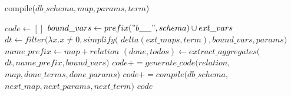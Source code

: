 


\newcommand{\indentcode}{\hspace{5mm}}
\begin{algorithm}
\caption{compile($db\_schema, map, params, term$)}
\label{alg:compile}
\begin{algorithmic}[1]
\STATE $code \leftarrow []$
  \STATE {}
  \STATE $bound\_vars \leftarrow prefix("b\_\_", schema) \cup ext\_vars$
  \STATE $dt \leftarrow filter(\lambda x. x \neq 0, simplify($
    \STATE \indentcode $delta(ext\_maps,term),bound\_vars, params)$
  \STATE $name\_prefix \leftarrow map+relation$
  \STATE $(done, todos) \leftarrow extract\_aggregates($
    \STATE \indentcode $dt, name\_prefix, bound\_vars)$
     \STATE $code += generate\_code(relation,$
     \STATE \indentcode $map, done\_terms, done\_params)$
  \ENDFOR
  \STATE {}
  \STATE $code += compile(db\_schema, $
  \STATE \indentcode $next\_map, next\_params, next\_term)$
  \ENDFOR
\ENDFOR
\RETURN $code$
\end{algorithmic}
\end{algorithm}

